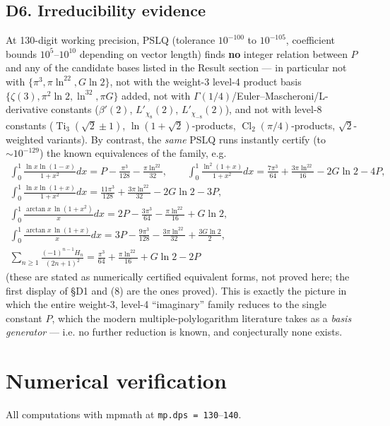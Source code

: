 \documentclass[11pt]{article}
\theoremstyle{remark}
\begin{document}
\subsection*{D6. Irreducibility evidence}

At 130-digit working precision, PSLQ (tolerance $10^{-100}$ to $10^{-105}$, coefficient bounds $10^{5}$--$10^{10}$ depending on vector length) finds \textbf{no} integer relation between $P$ and any of the candidate bases listed in the Result section --- in particular not with $\{\pi^3,\pi\ln^22,G\ln2\}$, not with the weight-3 level-4 product basis $\{\zeta(3),\pi^2\ln2,\ln^32,\pi G\}$ added, not with $\Gamma(1/4)$/Euler--Mascheroni/L-derivative constants ($\beta'(2)$, $L'_{\chi_8}(2)$, $L'_{\chi_{-8}}(2)$), and not with level-8 constants ($\operatorname{Ti}_3(\sqrt2\pm1)$, $\ln(1+\sqrt2)$-products, $\operatorname{Cl}_2(\pi/4)$-products, $\sqrt2$-weighted variants). By contrast, the \emph{same} PSLQ runs instantly certify (to $\sim10^{-129}$) the known equivalences of the family, e.g.
\begin{gather*}
\int_0^1\frac{\ln x\ln(1-x)}{1+x^2}dx=P-\frac{\pi^3}{128}-\frac{\pi\ln^22}{32},\qquad
\int_0^1\frac{\ln^2(1+x)}{1+x^2}dx=\frac{7\pi^3}{64}+\frac{3\pi\ln^22}{16}-2G\ln2-4P,\\
\int_0^1\frac{\ln x\ln(1+x)}{1+x^2}dx=\frac{11\pi^3}{128}+\frac{3\pi\ln^22}{32}-2G\ln2-3P,\\
\int_0^1\frac{\arctan x\,\ln(1+x^2)}{x}dx=2P-\frac{3\pi^3}{64}-\frac{\pi\ln^22}{16}+G\ln2,\\
\int_0^1\frac{\arctan x\,\ln(1+x)}{x}dx=3P-\frac{9\pi^3}{128}-\frac{3\pi\ln^22}{32}+\frac{3G\ln2}{2},\\
\sum_{n\ge1}\frac{(-1)^{n-1}H_n}{(2n+1)^2}=\frac{\pi^3}{64}+\frac{\pi\ln^22}{16}+G\ln2-2P
\end{gather*}
(these are stated as numerically certified equivalent forms, not proved here; the first display of \S D1 and (8) are the ones proved). This is exactly the picture in which the entire weight-3, level-4 ``imaginary'' family reduces to the single constant $P$, which the modern multiple-polylogarithm literature takes as a \emph{basis generator} --- i.e. no further reduction is known, and conjecturally none exists.

\section*{Numerical verification}

All computations with mpmath at \texttt{mp.dps = 130}--\texttt{140}.
\end{document}
